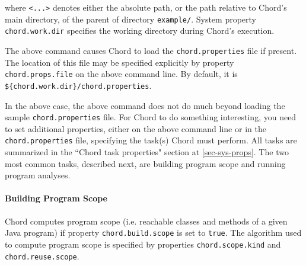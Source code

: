 \documentclass{article}
\begin{document}
where \verb+<...>+ denotes either the absolute path, or the path relative to Chord's main directory,
of the parent of directory {\tt example/}.
System property \verb+chord.work.dir+ specifies the working directory during Chord's execution.

The above command causes Chord to load the \verb+chord.properties+ file if present.
The location of this file may be specified explicitly by property
\verb+chord.props.file+ on the above command line.
By default, it is \verb+${chord.work.dir}/chord.properties+.

In the above case, the above command does not do much beyond loading the sample \verb+chord.properties+ file.
For Chord to do something interesting, you need to set additional properties, either
on the above command line or in the \verb+chord.properties+ file, specifying the task(s)
Chord must perform.
All tasks are summarized in the ``Chord task properties" section at \ref{sec-sys-props}.
The two most common tasks, described next, are building program scope and
running program analyses.

\paragraph{Building Program Scope}

Chord computes program scope (i.e. reachable classes and methods of a given Java program) if property
\verb+chord.build.scope+ is set to \verb+true+.
The algorithm used to compute program scope is specified by 
properties \verb+chord.scope.kind+ and \verb+chord.reuse.scope+.
\end{document}
